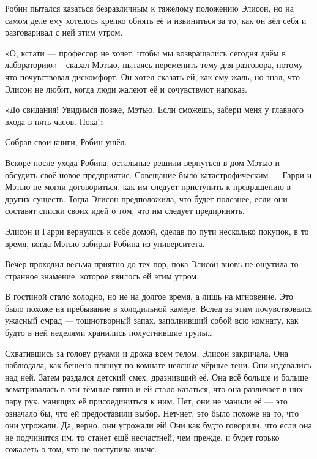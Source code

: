 \documentclass[a4paper,12pt]{book}
\begin{document}
\par
Робин пытался казаться безразличным к тяжёлому положению Элисон, но на самом деле ему хотелось крепко обнять её и извиниться за то, как он вёл себя и разговаривал с ней этим утром.
\par
«О, кстати — профессор не хочет, чтобы мы возвращались сегодня днём в лабораторию» - сказал Мэтью, пытаясь переменить тему для разговора, потому что почувствовал дискомфорт. Он хотел сказать ей, как ему жаль, но знал, что Элисон не любит, когда люди жалеют её и сочувствуют напоказ.
\par
«До свидания! Увидимся позже, Мэтью. Если сможешь, забери меня у главного входа в пять часов. Пока!»
\par
Собрав свои книги, Робин ушёл.\\
\par
Вскоре после ухода Робина, остальные решили вернуться в дом Мэтью и обсудить своё новое предприятие. Совещание было катастрофическим — Гарри и Мэтью не могли договориться, как им следует приступить к превращению в других существ. Тогда Элисон предположила, что будет полезнее, если они составят списки своих идей о том, что им следует предпринять.
\par
Элисон и Гарри вернулись к себе домой, сделав по пути несколько покупок, в то время, когда Мэтью забирал Робина из университета.
\par
Вечер проходил весьма приятно до тех пор, пока Элисон вновь не ощутила то странное знамение, которое явилось ей этим утром.
\par
В гостиной стало холодно, но не на долгое время, а лишь на мгновение. Это было похоже на пребывание в холодильной камере. Вслед за этим почувствовался ужасный смрад — тошнотворный запах, заполнивший собой всю комнату, как будто в ней неделями хранились полусгнившие трупы…
\par
Схватившись за голову руками и дрожа всем телом, Элисон закричала. Она наблюдала, как бешено пляшут по комнате неясные чёрные тени. Они издевались над ней. Затем раздался детский смех, дразнивший её. Она всё больше и больше всматривалась в эти тёмные пятна и ей стало казаться, что она различает в них пару рук, манящих её присоединиться к ним. Нет, они не манили её — это означало бы, что ей предоставили выбор. Нет-нет, это было похоже на то, что они угрожали. Да, верно, они угрожали ей! Они как будто говорили, что если она не подчинится им, то станет ещё несчастней, чем прежде, и будет горько сожалеть о том, что не поступила иначе.
\par
\end{document}
